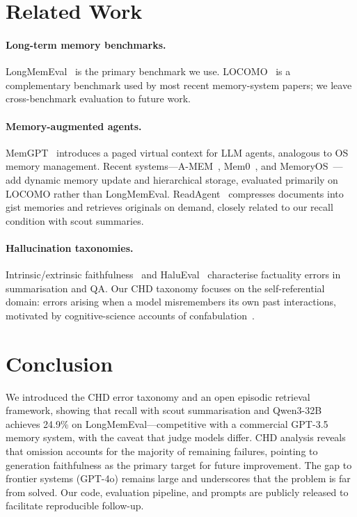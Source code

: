 \documentclass[11pt,twocolumn]{article}
\begin{document}
\section{Related Work}

\paragraph{Long-term memory benchmarks.}
LongMemEval~\cite{wu2025longmemeval} is the primary benchmark we use.
LOCOMO~\cite{maharana2024locomo} is a complementary benchmark used
by most recent memory-system papers; we leave cross-benchmark
evaluation to future work.

\paragraph{Memory-augmented agents.}
MemGPT~\cite{packer2023memgpt} introduces a paged virtual context for
LLM agents, analogous to OS memory management. Recent systems---A-MEM~\cite{xu2025amem}, Mem0~\cite{chhikara2025mem0}, and
MemoryOS~\cite{kang2025memoryos}---add dynamic memory update and
hierarchical storage, evaluated primarily on LOCOMO rather than
LongMemEval. ReadAgent~\cite{lee2024readagent} compresses documents
into gist memories and retrieves originals on demand, closely related
to our recall condition with scout summaries.

\paragraph{Hallucination taxonomies.}
Intrinsic/extrinsic faithfulness~\cite{maynez2020faithfulness} and
HaluEval~\cite{li2023halueval} characterise factuality errors in
summarisation and QA. Our CHD taxonomy focuses on the self-referential
domain: errors arising when a model misremembers its own past
interactions, motivated by cognitive-science accounts of
confabulation~\cite{schnider2008confabulating}.

\section{Conclusion}

We introduced the CHD error taxonomy and an open episodic retrieval
framework, showing that recall with scout summarisation and
Qwen3-32B achieves 24.9\% on LongMemEval---competitive with a
commercial GPT-3.5 memory system, with the caveat that judge models
differ. CHD analysis reveals that omission accounts for the majority
of remaining failures, pointing to generation faithfulness as the
primary target for future improvement. The gap to frontier systems
(GPT-4o) remains large and underscores that the problem is far from
solved. Our code, evaluation pipeline, and prompts are publicly
released to facilitate reproducible follow-up.
\end{document}
